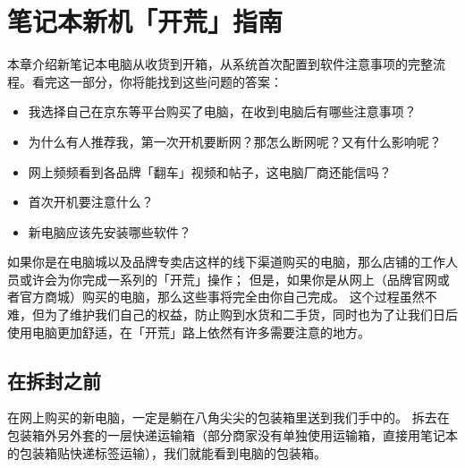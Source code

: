 \chapter{笔记本新机「开荒」指南}
\label{new-laptop-setup}

\begin{intro}
  本章介绍新笔记本电脑从收货到开箱，从系统首次配置到软件注意事项的完整流程。看完这一部分，你将能找到这些问题的答案：

  \begin{itemize}
    \item 我选择自己在京东等平台购买了电脑，在收到电脑后有哪些注意事项？
    \item 为什么有人推荐我，第一次开机要断网？那怎么断网呢？又有什么影响呢？
    \item 网上频频看到各品牌「翻车」视频和帖子，这电脑厂商还能信吗？
    \item 首次开机要注意什么？
    \item 新电脑应该先安装哪些软件？
  \end{itemize}
\end{intro}

如果你是在电脑城以及品牌专卖店这样的线下渠道购买的电脑，那么店铺的工作人员或许会为你完成一系列的「开荒」操作；
但是，如果你是从网上（品牌官网或者官方商城）购买的电脑，那么这些事将完全由你自己完成。
这个过程虽然不难，但为了维护我们自己的权益，防止购到水货和二手货，同时也为了让我们日后使用电脑更加舒适，在「开荒」路上依然有许多需要注意的地方。

\section{在拆封之前}

在网上购买的新电脑，一定是躺在八角尖尖的包装箱里送到我们手中的。
拆去在包装箱外另外套的一层快递运输箱（部分商家没有单独使用运输箱，直接用笔记本的包装箱贴快递标签运输），我们就能看到电脑的包装箱。

